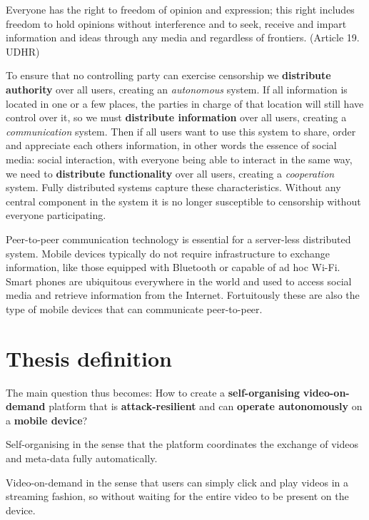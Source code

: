\begin{displayquote}
	Everyone has the right to freedom of opinion and expression; this right includes freedom to hold opinions without interference and to seek, receive and impart information and ideas through any media and regardless of frontiers.
	(Article 19. UDHR)
\end{displayquote}

To ensure that no controlling party can exercise censorship we \textbf{distribute authority} over all users, creating an \emph{autonomous} system.
If all information is located in one or a few places, the parties in charge of that location will still have control over it, so we must \textbf{distribute information} over all users, creating a \emph{communication} system.
Then if all users want to use this system to share, order and appreciate each others information, in other words the essence of social media: social interaction, with everyone being able to interact in the same way, we need to  \textbf{distribute functionality} over all users, creating a \emph{cooperation} system.
Fully distributed systems capture these characteristics. %
Without any central component in the system it is no longer susceptible to censorship without everyone participating.

Peer-to-peer communication technology is essential for a server-less distributed system.
Mobile devices typically do not require infrastructure to exchange information, like those equipped with Bluetooth or capable of ad hoc Wi-Fi.
Smart phones are ubiquitous everywhere in the world and used to access social media and retrieve information from the Internet.
Fortuitously these are also the type of mobile devices that can communicate peer-to-peer.

\section{Thesis definition}
The main question thus becomes:
How to create a \textbf{self-organising} \textbf{video-on-demand} platform that is \textbf{attack-resilient} and can \textbf{operate autonomously} on a \textbf{mobile device}?

Self-organising in the sense that the platform coordinates the exchange of videos and meta-data fully automatically.

Video-on-demand in the sense that users can simply click and play videos in a streaming fashion, so without waiting for the entire video to be present on the device.


